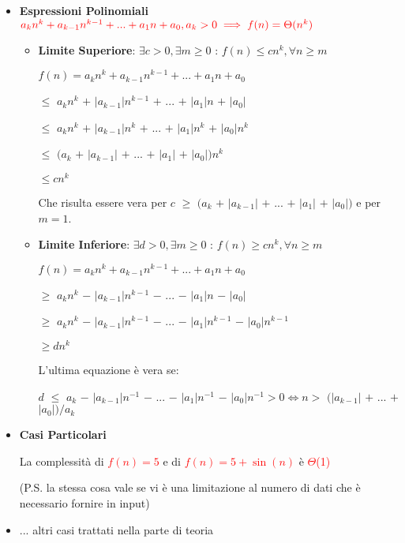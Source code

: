 \documentclass[../cheatSheetAlgoritmi.tex]{subfiles}
\begin{document}
\begin{itemize}
	\item \textbf{Espressioni Polinomiali}\\
		$\textcolor{red}{a_{k} n^k + a_{k-1} n^{k-1} + ... + a_{1}n + a_{0}, a_{k} > 0 \implies f(n) = \Theta(n^k)}$
		\begin{itemize}
			\item \textbf{Limite Superiore}: $\exists c > 0, \exists m \geq 0$ : $f(n) \leq cn^k, \forall n \geq m$
			
			$f(n) = a_{k} n^k + a_{k-1} n^{k-1} + ... + a_{1}n + a_{0}$
			
			$\leq$ $a_{k}n^k$ $+$ $\mid$$a_{k-1}$$\mid$$n^{k-1}$ $+$ ... $+$ $\mid$$a_{1}$$\mid$$n$ $+$ $\mid$$a_{0}$$\mid$ 
			
			$\leq$ $a_{k}n^k$ $+$ $\mid$$a_{k-1}$$\mid$$n^{k}$ $+$ ... $+$ $\mid$$a_{1}$$\mid$$n^k$ $+$ $\mid$$a_{0}$$\mid$$n^k$ 
			
			$\leq$ $(a_{k}$ $+$ $\mid$$a_{k-1}$$\mid$ $+$ ... $+$ $\mid$$a_{1}$$\mid$ $+$ $\mid$$a_{0}$$\mid$$)n^k$
			
			$\leq cn^k$
			
			Che risulta essere vera per $c$ $\geq$ $(a_{k}$ $+$ $\mid$$a_{k-1}$$\mid$ $+$ ... $+$ $\mid$$a_{1}$$\mid$ $+$ $\mid$$a_{0}$$\mid$$)$ e per $m = 1$.
			
			\item \textbf{Limite Inferiore}: $\exists d > 0, \exists m \geq 0$ : $f(n) \geq cn^k, \forall n \geq m$
			
			$f(n) = a_{k} n^k + a_{k-1} n^{k-1} + ... + a_{1}n + a_{0}$
			
			$\geq$ $a_{k}n^k$ $-$ $\mid$$a_{k-1}$$\mid$$n^{k-1}$ $-$ ... $-$ $\mid$$a_{1}$$\mid$$n$ $-$ $\mid$$a_{0}$$\mid$ 
			
			$\geq$ $a_{k}n^k$ $-$ $\mid$$a_{k-1}$$\mid$$n^{k-1}$ $-$ ... $-$ $\mid$$a_{1}$$\mid$$n^{k-1}$ $-$ $\mid$$a_{0}$$\mid$$n^{k-1}$ 
			
			$\geq dn^k$
			
			L'ultima equazione è vera se:
			
			$d$ $\leq$ $a_{k}$ $-$ $\mid$$a_{k-1}$$\mid$$n^{-1}$ $-$ ... $-$ $\mid$$a_{1}$$\mid$$n^{-1}$ $-$ $\mid$$a_{0}$$\mid$$n^{-1} > 0 \iff n >$ $(\mid$$a_{k-1}$$\mid$ $+$ ... $+$ $\mid$$a_{0}$$\mid)/a_{k}$
		\end{itemize}
	\item \textbf{Casi Particolari}
	
		La complessità di \textcolor{red}{$f(n) = 5$} e di \textcolor{red}{$f(n) = 5 + \sin(n)$} è \textcolor{red}{ $\Theta$(1)}
		
		(P.S. la stessa cosa vale se vi è una limitazione al numero di dati che è necessario fornire in input)
	\item ... altri casi trattati nella parte di teoria
\end{itemize}
\end{document}
